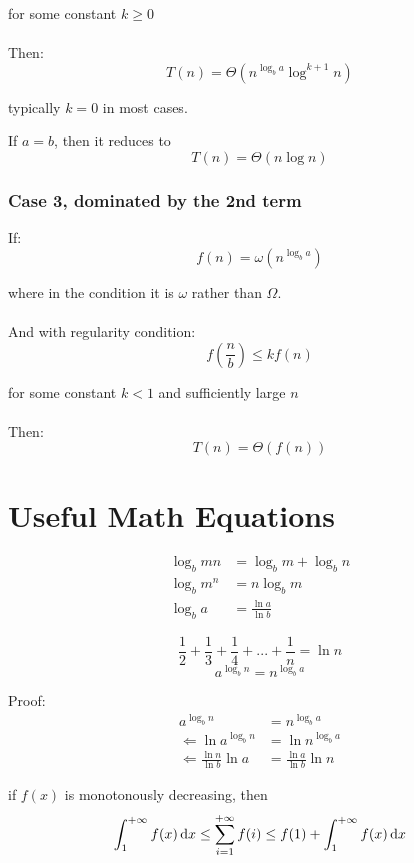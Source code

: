 for some constant $k \geq 0$\\\\
Then:
$$
T(n) = \Theta(n^{\log_b a} \log^{k+1} n)
$$

typically $k=0$ in most cases. 

If $a=b$, then it reduces to
$$
T(n) = \Theta(n \log n)
$$
\subsubsection*{Case 3, dominated by the 2nd term}
If:
$$f(n) = \omega(n^{\log_b a})$$

where in the condition it is $\omega$ rather than $\Omega$. \\\\
And with regularity condition:
$$f\left(\frac{n}{b}\right) \le k f(n)$$

for some constant $k < 1$ and sufficiently large $n$\\\\
Then:
$$T\left(n \right) = \Theta\left(f(n) \right)$$
\section{Useful Math Equations}
\begin{align*}
\log_b mn &= \log_b m + \log_b n \\
\log_b m^n &= n \log_b m \\
\log_b a &= \frac{\ln a}{\ln b}
\end{align*}

$$
\frac{1}{2}+\frac{1}{3}+\frac{1}{4} + ... + \frac{1}{n} = \ln{n}
$$
$$
a^{\log_b n} = n^{\log_b a}
$$

Proof:
\begin{align*}
a^{\log_b n} &= n^{\log_b a} \\
\Leftarrow \ln{a^{\log_b n}} &= \ln{n^{\log_b a}}\\
\Leftarrow  \frac{\ln n}{\ln b}\ln a &=\frac{\ln a}{\ln b}\ln n
\end{align*}


if $f(x)$ is monotonously decreasing, then
$$
\int_1^{+\infty}f(x) \mathop{}\!\mathrm{d} x \leq \sum_{i=1}^{+\infty} f(i) \leq f(1) + \int_1^{+\infty}f(x) \mathop{}\!\mathrm{d} x 
$$
